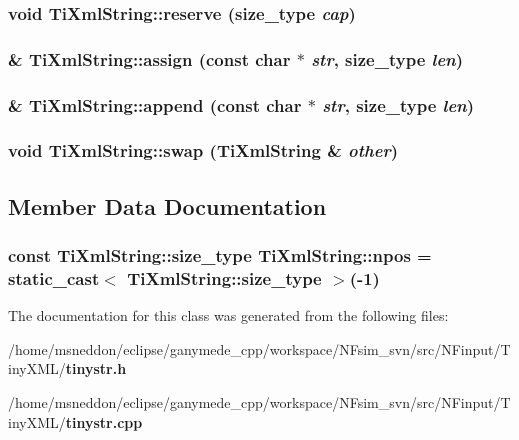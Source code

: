 \subsubsection{\setlength{\rightskip}{0pt plus 5cm}void TiXmlString::reserve ({\bf size\_\-type} {\em cap})}\label{classTiXmlString_88ecf9f0f00cb5c67b6b637958d7049c}


\subsubsection{ \& TiXmlString::assign (const char $\ast$ {\em str}, {\bf size\_\-type} {\em len})}\label{classTiXmlString_c72f3d9149b7812c1e6c59402014d0d5}


\subsubsection{ \& TiXmlString::append (const char $\ast$ {\em str}, {\bf size\_\-type} {\em len})}\label{classTiXmlString_d44b21700d2ec24a511367b222b643fb}


\subsubsection{\setlength{\rightskip}{0pt plus 5cm}void TiXmlString::swap ({\bf TiXmlString} \& {\em other})\hspace{0.3cm}{\tt  [inline]}}\label{classTiXmlString_a392cbc180752a79f007f4f9280c7762}




\subsection{Member Data Documentation}
\subsubsection{\setlength{\rightskip}{0pt plus 5cm}const {\bf TiXmlString::size\_\-type} {\bf TiXmlString::npos} = static\_\-cast$<$ {\bf TiXmlString::size\_\-type} $>$(-1)\hspace{0.3cm}{\tt  [static]}}\label{classTiXmlString_8f4422d227088dc7bec96f479b275d0a}




The documentation for this class was generated from the following files:\begin{CompactItemize}
\item 
/home/msneddon/eclipse/ganymede\_\-cpp/workspace/NFsim\_\-svn/src/NFinput/TinyXML/{\bf tinystr.h}\item 
/home/msneddon/eclipse/ganymede\_\-cpp/workspace/NFsim\_\-svn/src/NFinput/TinyXML/{\bf tinystr.cpp}\end{CompactItemize}
